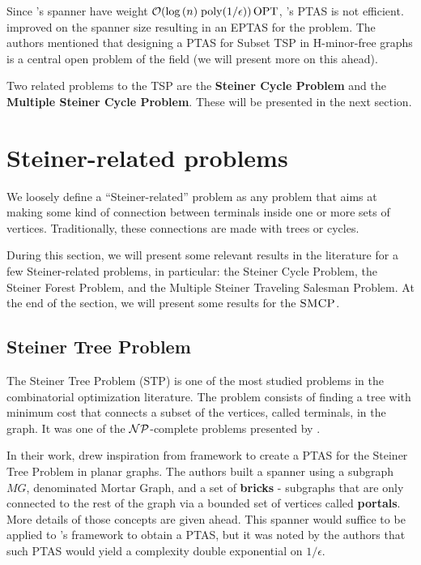 Since \citeauthor{light_spanners_tsp}'s spanner have weight \(\mathcal{O}(\log{(n)} \; \mathrm{poly}(1 / \epsilon)) \operatorname{\textrm{OPT}}\), \citeauthor{contraction-decomposition-in-h-minor-free-graphs}'s PTAS is not efficient. \cite{eptas-tsp-h-minor-free} improved on the spanner size resulting in an EPTAS for the problem. The authors mentioned that designing a PTAS for Subset TSP in H-minor-free graphs is a central open problem of the field (we will present more on this ahead).

Two related problems to the TSP are the \textbf{Steiner Cycle Problem} and the \textbf{Multiple Steiner Cycle Problem}. These will be presented in the next section.

\section{Steiner-related problems}

We loosely define a ``Steiner-related'' problem as any problem that aims at making some kind of connection between terminals inside one or more sets of vertices. Traditionally, these connections are made with trees or cycles.

During this section, we will present some relevant results in the literature for a few Steiner-related problems, in particular: the Steiner Cycle Problem, the Steiner Forest Problem, and the Multiple Steiner Traveling Salesman Problem. At the end of the section, we will present some results for the \(\textsc{SMCP}\).

\subsection{Steiner Tree Problem}

The Steiner Tree Problem (STP) is one of the most studied problems in the combinatorial optimization literature. The problem consists of finding a tree with minimum cost that connects a subset of the vertices, called terminals, in the graph. It was one of the \(\mathcal{NP}\)-complete problems presented by \cite{Karp1972}.

In their work, \cite{Borradaile2009b} drew inspiration from \cite{KleinTSP} framework to create a PTAS for the Steiner Tree Problem in planar graphs. The authors built a spanner using a subgraph \(MG\), denominated Mortar Graph, and a set of \textbf{bricks} - subgraphs that are only connected to the rest of the graph via a bounded set of vertices called \textbf{portals}. More details of those concepts are given ahead. This spanner would suffice to be applied to \citeauthor{KleinTSP}'s framework to obtain a PTAS, but it was noted by the authors that such PTAS would yield a complexity double exponential on \(1 / \epsilon\).

